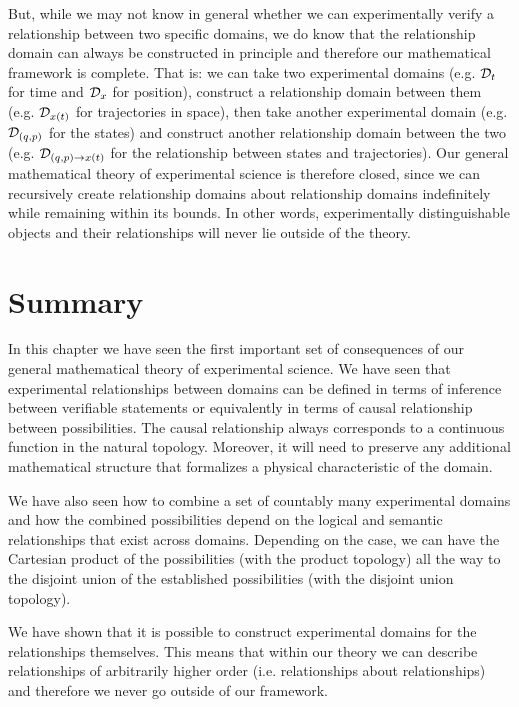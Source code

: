 \documentclass[11pt,letterpaper,fleqn]{memoir} %
\begin{document}
But, while we may not know in general whether we can experimentally verify a relationship between two specific domains, we do know that the relationship domain can always be constructed in principle and therefore our mathematical framework is complete. That is: we can take two experimental domains (e.g. $\mathcal{D}_t$ for time and $\mathcal{D}_x$ for position), construct a relationship domain between them (e.g. $\mathcal{D}_{x(t)}$ for trajectories in space), then take another experimental domain (e.g. $\mathcal{D}_{(q,p)}$ for the states) and construct another relationship domain between the two (e.g. $\mathcal{D}_{(q,p)\to x(t)}$ for the relationship between states and trajectories). Our general mathematical theory of experimental science is therefore closed, since we can recursively create relationship domains about relationship domains indefinitely while remaining within its bounds. In other words, experimentally distinguishable objects and their relationships will never lie outside of the theory.


\section{Summary}

In this chapter we have seen the first important set of consequences of our general mathematical theory of experimental science. We have seen that experimental relationships between domains can be defined in terms of inference between verifiable statements or equivalently in terms of causal relationship between possibilities. The causal relationship always corresponds to a continuous function in the natural topology. Moreover, it will need to preserve any additional mathematical structure that formalizes a physical characteristic of the domain.

We have also seen how to combine a set of countably many experimental domains and how the combined possibilities depend on the logical and semantic relationships that exist across domains. Depending on the case, we can have the Cartesian product of the possibilities (with the product topology) all the way to the disjoint union of the established possibilities (with the disjoint union topology).

We have shown that it is possible to construct experimental domains for the relationships themselves. This means that within our theory we can describe relationships of arbitrarily higher order (i.e. relationships about relationships) and therefore we never go outside of our framework.
\end{document}

